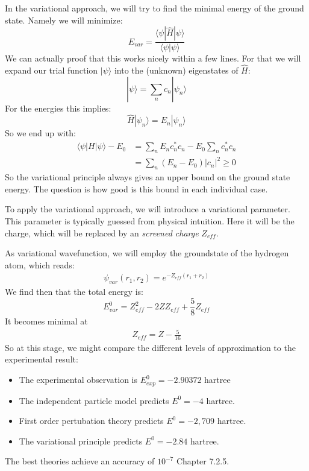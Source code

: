 \documentclass[10pt]{article}
\let\cite\citep
\providecommand\citep{\cite}
\begin{document}
In the variational approach, we will try to find the minimal energy of the ground state. Namely we will minimize:
\begin{equation}
E_{var} = \frac{\langle\psi|\hat{H}|\psi\rangle}{\langle\psi|\psi\rangle}
\end{equation}
We can actually proof that this works nicely within a few lines. For that we will expand our trial function $|\psi\rangle$ into the (unknown) eigenstates of $\hat{H}$:
\begin{equation}
|\psi\rangle = \sum_n c_n |\psi_n\rangle
\end{equation}
For the energies this implies:
\begin{equation}
\hat{H}|\psi_n\rangle = E_n|\psi_n\rangle
\end{equation}
So we end up with:
\begin{align}
\langle \psi|H|\psi\rangle - E_0 &= \sum_n E_n c_n^*c_n - E_0 \sum_n c_n^*c_n\\
&= \sum_n (E_n-E_0)|c_n|^2 \geq 0
\end{align}
So the variational principle always gives an upper bound on the ground state energy. The question is how good is this bound in each individual case.

To apply the variational approach, we will introduce a variational parameter. This parameter is typically guessed from physical intuition. Here it will be the charge, which will be replaced by an \textit{screened charge} $Z_{eff}$.



As variational wavefunction, we will employ the groundstate of the hydrogen atom, which reads:
\begin{align}
\psi_{var}(r_1, r_2) = e^{-Z_{eff}(r_1+r_2)}
\end{align}
We find then that the total energy is:
\begin{equation}
E_{var}^0 = Z_{eff}^2 -2ZZ_{eff}+\frac{5}{8}Z_{eff}
\end{equation}
It becomes minimal at
\begin{align}
Z_{eff} = Z- \frac{5}{16}
\end{align}
So at this stage, we might compare the different levels of approximation to the experimental result:
\begin{itemize}
\item The experimental observation is $E_{exp}^0=-2.90372$ hartree
\item The independent particle model predicts $E^0 = -4 $ hartree.
\item First order pertubation theory predicts $E^0 = -2,709$ hartree.
\item The variational principle predicts $E^0 = -2.84$ hartree.
\end{itemize}
The best theories achieve an accuracy of $10^{-7}$ \cite{Hertel_2015} Chapter 7.2.5.
\end{document}
